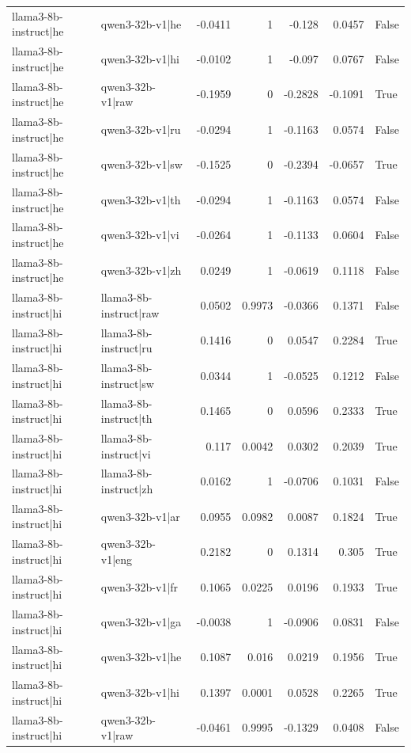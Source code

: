 \begin{table}
\begin{tabular}{l l r r r r l}
llama3-8b-instruct|he & qwen3-32b-v1|he & -0.0411 & 1 & -0.128 & 0.0457 & False \\
llama3-8b-instruct|he & qwen3-32b-v1|hi & -0.0102 & 1 & -0.097 & 0.0767 & False \\
llama3-8b-instruct|he & qwen3-32b-v1|raw & -0.1959 & 0 & -0.2828 & -0.1091 & True \\
llama3-8b-instruct|he & qwen3-32b-v1|ru & -0.0294 & 1 & -0.1163 & 0.0574 & False \\
llama3-8b-instruct|he & qwen3-32b-v1|sw & -0.1525 & 0 & -0.2394 & -0.0657 & True \\
llama3-8b-instruct|he & qwen3-32b-v1|th & -0.0294 & 1 & -0.1163 & 0.0574 & False \\
llama3-8b-instruct|he & qwen3-32b-v1|vi & -0.0264 & 1 & -0.1133 & 0.0604 & False \\
llama3-8b-instruct|he & qwen3-32b-v1|zh & 0.0249 & 1 & -0.0619 & 0.1118 & False \\
llama3-8b-instruct|hi & llama3-8b-instruct|raw & 0.0502 & 0.9973 & -0.0366 & 0.1371 & False \\
llama3-8b-instruct|hi & llama3-8b-instruct|ru & 0.1416 & 0 & 0.0547 & 0.2284 & True \\
llama3-8b-instruct|hi & llama3-8b-instruct|sw & 0.0344 & 1 & -0.0525 & 0.1212 & False \\
llama3-8b-instruct|hi & llama3-8b-instruct|th & 0.1465 & 0 & 0.0596 & 0.2333 & True \\
llama3-8b-instruct|hi & llama3-8b-instruct|vi & 0.117 & 0.0042 & 0.0302 & 0.2039 & True \\
llama3-8b-instruct|hi & llama3-8b-instruct|zh & 0.0162 & 1 & -0.0706 & 0.1031 & False \\
llama3-8b-instruct|hi & qwen3-32b-v1|ar & 0.0955 & 0.0982 & 0.0087 & 0.1824 & True \\
llama3-8b-instruct|hi & qwen3-32b-v1|eng & 0.2182 & 0 & 0.1314 & 0.305 & True \\
llama3-8b-instruct|hi & qwen3-32b-v1|fr & 0.1065 & 0.0225 & 0.0196 & 0.1933 & True \\
llama3-8b-instruct|hi & qwen3-32b-v1|ga & -0.0038 & 1 & -0.0906 & 0.0831 & False \\
llama3-8b-instruct|hi & qwen3-32b-v1|he & 0.1087 & 0.016 & 0.0219 & 0.1956 & True \\
llama3-8b-instruct|hi & qwen3-32b-v1|hi & 0.1397 & 0.0001 & 0.0528 & 0.2265 & True \\
llama3-8b-instruct|hi & qwen3-32b-v1|raw & -0.0461 & 0.9995 & -0.1329 & 0.0408 & False \\

\end{tabular}
\end{table}
